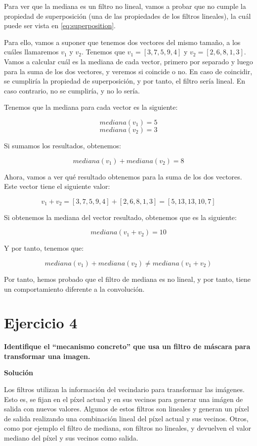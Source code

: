 \documentclass[11pt,a4paper]{article}
\newcommand{\answer}{\noindent\textbf{Solución}}
\newcommand{\question}[1]{\noindent\textbf{#1}}
\newcommand{\nonumbersection}[1]{\section*{#1}\addcontentsline{toc}{section}{#1}}
\begin{document}
Para ver que la mediana es un filtro no lineal, vamos a probar que no cumple la propiedad de superposición (una de las propiedades
de los filtros lineales), la cuál puede ser vista en \eqref{eq:superposition}.

Para ello, vamos a suponer que tenemos dos vectores del mismo tamaño, a los cuáles llamaremos $v_1$ y $v_2$. Tenemos que
$v_1 = [3, 7, 5, 9, 4]$ y $v_2 = [2, 6, 8, 1, 3]$. Vamos a calcular cuál es la mediana de cada vector, primero por
separado y luego para la suma de los dos vectores, y veremos si coincide o no. En caso de coincidir, se cumpliría la
propiedad de superposición, y por tanto, el filtro sería lineal. En caso contrario, no se cumpliría, y no lo sería.

Tenemos que la mediana para cada vector es la siguiente:

\[mediana(v_1) = 5 \]
\[mediana(v_2) = 3 \]

Si sumamos los resultados, obtenemos:

\[mediana(v_1) + mediana(v_2) = 8\]

Ahora, vamos a ver qué resultado obtenemos para la suma de los dos vectores. Este vector tiene el siguiente valor:

\[v_1 + v_2 = [3, 7, 5, 9, 4] + [2, 6, 8, 1, 3] = [5, 13, 13, 10, 7]\]

Si obtenemos la mediana del vector resultado, obtenemos que es la siguiente:

\[mediana(v_1 + v_2) = 10\]

Y por tanto, tenemos que:

\[mediana(v_1) + mediana(v_2) \neq mediana(v_1 + v_2)\]

Por tanto, hemos probado que el filtro de mediana es no lineal, y por tanto, tiene un comportamiento diferente a la
convolución.

\nonumbersection{Ejercicio 4}

\question{Identifique el ``mecanismo concreto'' que usa un filtro de máscara para transformar una imagen.}

\answer

Los filtros utilizan la información del vecindario para transformar las imágenes. Esto es, se fijan en el píxel actual y
en sus vecinos para generar una imágen de salida con nuevos valores. Algunos de estos filtros son lineales y generan
un píxel de salida realizando una combinación lineal del píxel actual y sus vecinos. Otros, como por ejemplo el filtro
de mediana, son filtros no lineales, y devuelven el valor mediano del píxel y sus vecinos como salida.
\end{document}
